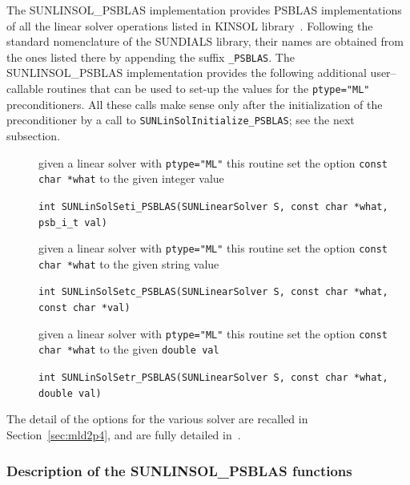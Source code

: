 \documentclass[twoside,a4paper]{refart}
\theoremstyle{definition}
\begin{document}
The SUNLINSOL\_PSBLAS implementation provides PSBLAS implementations of all the linear solver operations listed in KINSOL library~\cite[Section~8.1.1]{kinsolguide}. Following the standard nomenclature of the SUNDIALS library, their names are obtained from the ones listed there by appending the suffix \texttt{\_PSBLAS}. The SUNLINSOL\_PSBLAS implementation provides the following additional user--callable routines that can be used to set-up the values for the \lstinline[style=CStyle]|ptype="ML"| preconditioners. \attention All these calls make sense only after the initialization of the preconditioner by a call to \texttt{SUNLinSolInitialize\_PSBLAS}; see the next subsection. 

\begin{description}
\item[] given a linear solver with \lstinline[style=CStyle]|ptype="ML"| this routine set the option \lstinline[style=CStyle]|const char *what| to the given integer value

 \lstinline[style=CStyle]|int SUNLinSolSeti_PSBLAS(SUNLinearSolver S, const char *what, psb_i_t val)|

\item[] given a linear solver with \lstinline[style=CStyle]|ptype="ML"| this routine set the option \lstinline[style=CStyle]|const char *what| to the given string value

 \lstinline[style=CStyle]|int SUNLinSolSetc_PSBLAS(SUNLinearSolver S, const char *what, const char *val)|

\item[] given a linear solver with \lstinline[style=CStyle]|ptype="ML"| this routine set the option \lstinline[style=CStyle]|const char *what| to the given \lstinline[style=CStyle]|double val|

 \lstinline[style=CStyle]|int SUNLinSolSetr_PSBLAS(SUNLinearSolver S, const char *what, double val)|
\end{description}

The detail of the options for the various solver are recalled in Section~\ref{sec:mld2p4}, and are fully detailed in~\cite{mld2p4guide}.

\subsubsection{Description of the SUNLINSOL\_PSBLAS functions}
\end{document}
